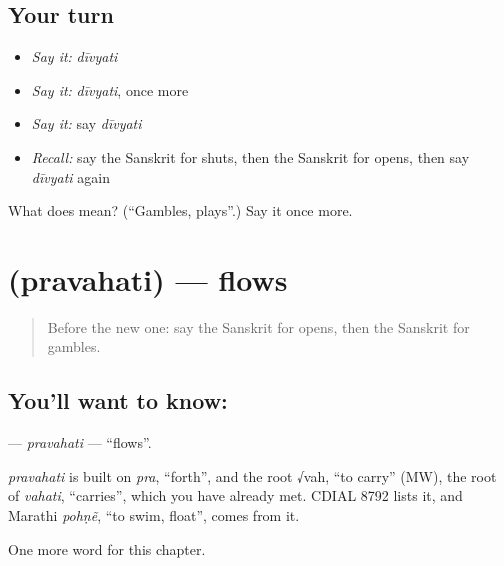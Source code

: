 \subsection*{Your turn}
\begin{itemize}
\raggedright
  \item \emph{Say it:} \emph{dīvyati}
  \item \emph{Say it:} \emph{dīvyati}, once more
  \item \emph{Say it:} say \emph{dīvyati}
  \item \emph{Recall:} say the Sanskrit for shuts, then the Sanskrit for opens, then say \emph{dīvyati} again
\end{itemize}

\begin{tcolorbox}[breakable,colback=teal!4,colframe=teal!35!black,title={Before you move on}]
What does  mean? (\textquotedblleft{}Gambles, plays\textquotedblright{}.) Say it once more.
\end{tcolorbox}
\section[\texorpdfstring{\sk{प्रवहति} (pravahati)}{प्रवहति (pravahati)}]{ (pravahati) — flows}

\label{lesson:SA-C207-pravahati}



\begin{quote}
Before the new one: say the Sanskrit for opens, then the Sanskrit for gambles.
\end{quote}

\subsection*{You'll want to know: }
\textbf{} — \emph{pravahati} — \textquotedblleft{}flows\textquotedblright{}.

\begin{cousinweb}
\emph{pravahati} is built on \emph{pra}, \textquotedblleft{}forth\textquotedblright{}, and the root √vah, \textquotedblleft{}to carry\textquotedblright{} (MW), the root of \emph{vahati}, \textquotedblleft{}carries\textquotedblright{}, which you have already met. CDIAL 8792 lists it, and Marathi \emph{pohṇẽ}, \textquotedblleft{}to swim, float\textquotedblright{}, comes from it.
\end{cousinweb}

\begin{grammarlens}[title={What you've built}]
One more word for this chapter.
\end{grammarlens}

